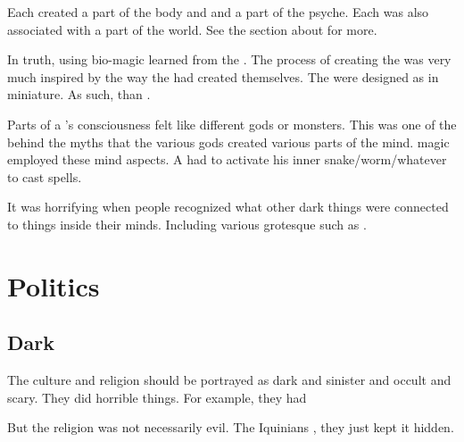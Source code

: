 Each \Primordial created a part of the body and and a part of the \scathaese psyche. 
Each was also associated with a part of the world. 
See the section about  for more. 

In truth,  using bio-magic learned from the \xss.
The process of creating the \scathae was very much inspired by the way the \dragons had created themselves.
The \scathae were designed as \dragons in miniature.
As such, \scathae {} than .

Parts of a \scatha's consciousness felt like different gods or monsters. 
This was one of the  behind the myths that the various gods created various parts of the \scathaese mind. 
\Rethyax magic employed these mind aspects. 
A \rethyax had to activate his inner snake/worm/whatever to cast spells. 

It was horrifying when people recognized what other dark things were connected to things inside their minds.
Including various grotesque \xss such as \Ubloth.














\section{Politics}









\subsection{Dark}
The \Ortaican culture and religion should be portrayed as dark and sinister and occult and scary. 
They did horrible things. 
For example, they had 

But the \Ortaican religion was not necessarily evil.
The Iquinians , they just kept it hidden. 









